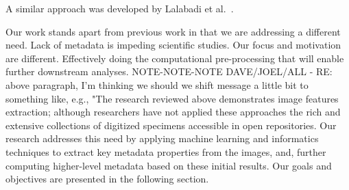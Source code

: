 \documentclass[conference]{IEEEtran}
\begin{document}
A similar approach was developed by Lalabadi et al.~\cite{Lalabadi2020FishFC}.

Our work stands apart from previous work in that we are
addressing a different need. Lack of metadata is impeding scientific studies.
Our focus and motivation are different.
Effectively doing the computational pre-processing
that will enable further downstream analyses.
NOTE-NOTE-NOTE DAVE/JOEL/ALL - RE: above paragraph, I'm thinking we should we shift message a little bit to something like, e.g., "The research reviewed above demonstrates image features extraction; although researchers have not applied these approaches the rich and extensive collections of digitized specimens accessible in open repositories. Our research addresses this need by applying machine learning and informatics techniques to extract key metadata properties from the images, and, further computing higher-level metadata based on these initial results. Our goals and objectives are presented in the following section.



\end{document}
